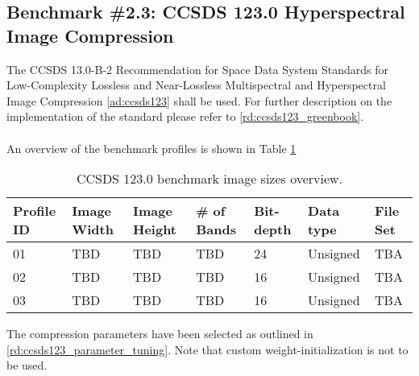 \newpage
\subsection{Benchmark \#2.3: CCSDS 123.0 Hyperspectral Image Compression}
The CCSDS 13.0-B-2 Recommendation for Space Data System Standards for Low-Complexity Lossless and Near-Lossless Multispectral and Hyperspectral Image Compression \ref{ad:ccsds123} shall be used. For further description on the implementation of the standard please refer to \ref{rd:ccsds123_greenbook}.\\
\\
An overview of the benchmark profiles is shown in Table \ref{tab:ccsds123_profiles}\\

%
%

\begin{table}[!h]
\centering
\begin{tabular}{|l|l|l|l|l|l|l|}
    \hline
    Profile ID  & Image Width     & Image Height    & \# of Bands   & Bit-depth	 & Data type       & File Set      \\ \hline 
    \hline
    01	        & TBD	          & TBD	            & TBD            & 24         & Unsigned        & TBA           \\ \hline
    02	        & TBD	          & TBD	            & TBD            & 16         & Unsigned        & TBA           \\ \hline
    03	        & TBD	          & TBD	            & TBD            & 16         & Unsigned        & TBA           \\ \hline
\end{tabular}
\caption{CCSDS 123.0 benchmark image sizes overview.}
\label{tab:ccsds123_profiles}
\end{table}
%
The compression parameters have been selected as outlined in \ref{rd:ccsds123_parameter_tuning}. Note that custom weight-initialization is not to be used.


%
%
%
%
%


